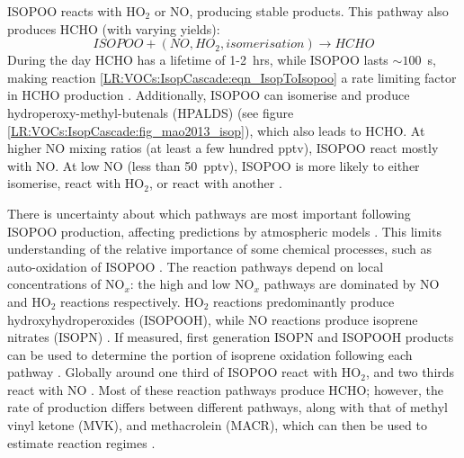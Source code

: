     ISOPOO reacts with HO$_2$ or NO, producing stable products. 
    This pathway also produces HCHO (with varying yields):
    \begin{equation}
      ISOPOO + (NO, HO_2, isomerisation) \rightarrow HCHO 
    \end{equation}
    During the day HCHO has a lifetime of 1-2~hrs, while ISOPOO lasts $\sim 100$~s, making reaction \ref{LR:VOCs:IsopCascade:eqn_IsopToIsopoo} a rate limiting factor in HCHO production \parencite{Wolfe2016}.
    Additionally, ISOPOO can isomerise and produce hydroperoxy-methyl-butenals (HPALDS) (see figure \ref{LR:VOCs:IsopCascade:fig_mao2013_isop}), which also leads to HCHO.
    At higher NO mixing ratios (at least a few hundred pptv), ISOPOO react mostly with NO. 
    At low NO (less than 50~pptv), ISOPOO is more likely to either isomerise, react with HO$_2$, or react with another \roo.
      
      
    
    There is uncertainty about which pathways are most important following 
    ISOPOO production, affecting predictions by atmospheric models 
    \parencite{Nguyen2014}.
    This limits understanding of the relative importance of some chemical processes, such as auto-oxidation of ISOPOO \parencite{Crounse2013}.
    The reaction pathways depend on local concentrations of NO$_x$: the high and low NO$_x$ pathways are dominated by NO and HO$_2$ reactions respectively.
    HO$_2$ reactions predominantly produce hydroxyhydroperoxides (ISOPOOH), while NO reactions produce isoprene nitrates (ISOPN) \parencite{Crounse2006}.
    If measured, first generation ISOPN and ISOPOOH products can be used to determine the portion of isoprene oxidation following each pathway \parencite[e.g.,][]{Yu2016}.
    Globally around one third of ISOPOO react with HO$_2$, and two thirds react with NO \parencite{Paulot2009b}.
    Most of these reaction pathways produce HCHO; however, the rate of production differs between different pathways, along with that of methyl vinyl ketone (MVK), and methacrolein (MACR), which can then be used to estimate reaction regimes \parencite{Marais2012, Liu2016a, Wolfe2016}.
    
